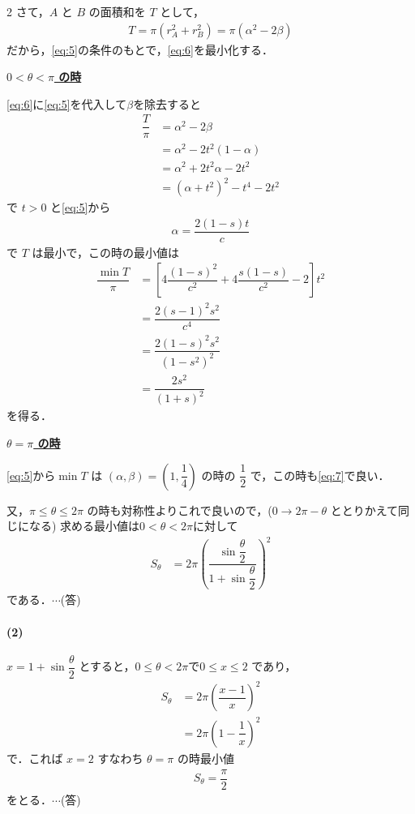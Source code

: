 \documentclass[../../main.tex]{subfiles}
\begin{document}
\begin{multicols}{2}
  さて，$A$ と $B$ の面積和を $T$ として，
  \begin{align}
    T = \pi(r_A^2+r_B^2) = \pi(\alpha^2-2\beta) \label{eq:6}
  \end{align}
  だから，\cref{eq:5}の条件のもとで，\cref{eq:6}を最小化する．

  \underline{\textbf{$0 < \theta < \pi$ の時}}

  \cref{eq:6}に\cref{eq:5}を代入して$\beta$を除去すると
  \begin{align}
    \dfrac{T}{\pi}
    & = \alpha^2-2\beta          \\
    & = \alpha^2-2t^2(1-\alpha)  \\
    & = \alpha^2+2t^2\alpha-2t^2 \\
    & = (\alpha+t^2)^2-t^4-2t^2
  \end{align}
  で $t>0$ と\cref{eq:5}から
  \begin{align}
    \alpha = \dfrac{2(1-s)t}{c}
  \end{align}
  で $T$ は最小で，この時の最小値は
  \begin{align}
    \dfrac{\min T}{\pi}
    & = \left[ 4\dfrac{(1-s)^2}{c^2} + 4\dfrac{s(1-s)}{c^2} - 2 \right] t^2 \nonumber \\
    & = \dfrac{2(s-1)^2 s^2}{c^4}                                          \nonumber \\
    & = \dfrac{2(1-s)^2 s^2}{(1-s^2)^2}                                    \nonumber \\
    & = \dfrac{2s^2}{(1+s)^2} \label{eq:7}
  \end{align}
  を得る．

  \underline{\textbf{$\theta=\pi$ の時}}

  \cref{eq:5}から$\min T$ は
  $(\alpha,\beta)=(1,\dfrac{1}{4})$ の時の $\dfrac{1}{2}$ で，この時も\cref{eq:7}で良い．

  又，$\pi \le \theta \le 2\pi$ の時も対称性よりこれで良いので，($0 \to 2\pi-\theta$ ととりかえて同じになる)
  求める最小値は$0<\theta<2\pi$に対して
  \begin{align}
    S_\theta
    & = 2\pi \left(\dfrac{\sin\dfrac{\theta}{2}}{1+\sin\dfrac{\theta}{2}}\right)^2
  \end{align}
  である．$\cdots$(答)

  \paragraph{(2)}

  $x=1+\sin\dfrac{\theta}{2}$ とすると，$0\le \theta < 2\pi$で$0 \le x \le 2$ であり，
  \begin{align}
    S_{\theta}
    & = 2\pi \left(\dfrac{x-1}{x}\right)^2 \\
    & = 2\pi \left(1-\dfrac{1}{x}\right)^2
  \end{align}
  で．これば $x=2$ すなわち $\theta=\pi$ の時最小値
  \begin{align}
    S_\theta = \dfrac{\pi}{2}
  \end{align}
  をとる．$\cdots$(答)


\end{multicols}
\end{document}
